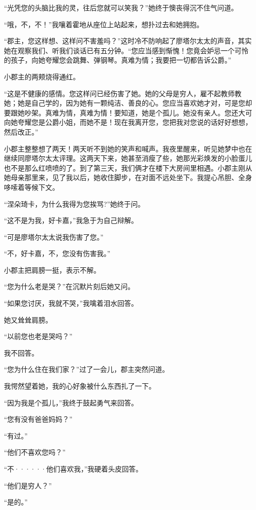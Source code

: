 \documentclass[12pt, UTF8]{ctexbook}
\begin{document}
\par “光凭您的头脑比我的灵，往后您就可以笑我？”她终于懊丧得沉不住气问道。
\par “哦，不，不！”我嚷着霍地从座位上站起来，想扑过去和她拥抱。
\par “郡主，您这样想、这样问不害羞吗？”这时冷不防响起了廖塔尔太太的声音，其实她在观察我们、听我们谈话已有五分钟。“您应当感到惭愧！您竟会妒忌一个可怜的孩子，向她夸耀您会跳舞、弹钢琴。真难为情；我要把一切都告诉公爵。”
\par 小郡主的两颊烧得通红。
\par “这是不健康的感情。您这样问已经伤害了她。她的父母是穷人，雇不起教师教她；她是自己学的，因为她有一颗纯洁、善良的心。您应当喜欢她才对，可是您却要跟她吵架。真难为情，真难为情！要知道，她是个孤儿。她没有亲人。您还大可向她夸耀您是公爵小姐，而她不是！现在我离开您，您把我对您说的话好好想想，然后改正。”
\par 小郡主整整想了两天！两天听不到她的笑声和喊声。我夜里醒来，听见她梦中也在继续同廖塔尔太太评理。这两天下来，她甚至消瘦了些，她那光彩焕发的小脸蛋儿也不是那么红喷喷的了。到了第三天，我们俩才在楼下大房间里相遇。小郡主刚从她母亲那里来，见了我以后，她收住脚步，在对面不远处坐下。我提心吊胆、全身哆嗦着等候下文。
\par “涅朵琦卡，为什么我得为您挨骂?”她终于问。
\par “这不是为我，好卡嘉，”我急于为自己辩解。
\par “可是廖塔尔太太说我伤害了您。”
\par “不，好卡嘉，不，您没有伤害我。”
\par 小郡主把肩膀一挺，表示不解。
\par “您为什么老是哭？”在沉默片刻后她又问。
\par “如果您讨厌，我就不哭，”我噙着泪水回答。
\par 她又耸耸肩膀。
\par “以前您也老是哭吗？”
\par 我不回答。
\par “您为什么住在我们家？”过了一会儿，郡主突然问道。
\par 我愕然望着她，我的心好象被什么东西扎了一下。
\par “因为我是个孤儿，”我终于鼓起勇气来回答。
\par “您有没有爸爸妈妈？”
\par “有过。”
\par “他们不喜欢您吗？”
\par “不······他们喜欢我，”我硬着头皮回答。
\par “他们是穷人？”
\par “是的。”
\end{document}
